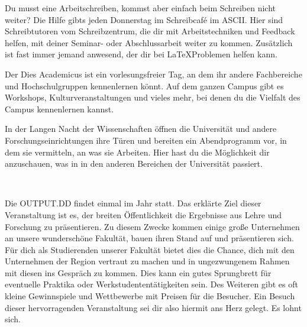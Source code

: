 
Du musst eine Arbeitschreiben, kommst aber einfach beim Schreiben nicht weiter? Die Hilfe gibts jeden Donnerstag im Schreibcaf\'e im ASCII. Hier sind Schreibtutoren vom Schreibzentrum, die dir mit Arbeitstechniken und Feedback helfen, mit deiner Seminar- oder Abschlussarbeit weiter zu kommen. Zusätzlich ist fast immer jemand anwesend, der dir bei \LaTeX Problemen helfen kann.


Der Dies Academicus ist ein vorlesungsfreier Tag, an dem ihr andere Fachbereiche und Hochschulgruppen kennenlernen könnt. Auf dem ganzen Campus gibt es Workshops, Kulturveranstaltungen und vieles mehr, bei denen du die Vielfalt des Campus kennenlernen kannst.


In der Langen Nacht der Wissenschaften öffnen die Universität und andere Forschungseinrichtungen ihre Türen und bereiten ein Abendprogramm vor, in dem sie vermitteln, an was sie Arbeiten. Hier hast du die Möglichkeit dir anzuschauen, was in in den anderen Bereichen der Universität passiert.

\pagebreak

\
\thispagestyle{empty}

\pagebreak


Die OUTPUT.DD findet einmal im Jahr statt. Das erklärte Ziel dieser Veranstaltung ist es, der breiten Öffentlichkeit die Ergebnisse aus Lehre und Forschung zu präsentieren. Zu diesem Zwecke kommen einige große Unternehmen an unsere wunderschöne Fakultät, bauen ihren Stand auf und präsentieren sich. Für dich als Studierenden unserer Fakultät bietet dies die Chance, dich mit den Unternehmen der Region vertraut zu machen und in ungezwungenem Rahmen mit diesen ins Gespräch zu kommen. Dies kann ein gutes Sprungbrett für eventuelle Praktika oder Werkstudententätigkeiten sein. Des Weiteren gibt es oft kleine Gewinnspiele und Wettbewerbe mit Preisen für die Besucher. Ein Besuch dieser hervorragenden Veranstaltung sei dir also hiermit ans Herz gelegt. Es lohnt sich.

